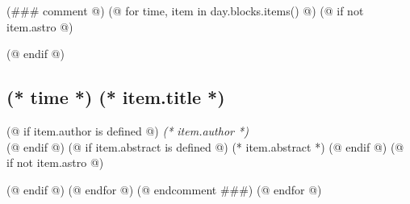 \documentclass[a4paper]{report}
\begin{document}
(### comment @)
        (@ for time, item in day.blocks.items() @)
            (@ if not item.astro @)
                \begin{tcolorbox}
            (@ endif @)
                \subsection{(* time *) \hfill (* item.title *)}
                (@ if item.author is defined @)
                    \hfill \textit{(* item.author *)} \\
                (@ endif @)
                (@ if item.abstract is defined @)
                    (* item.abstract *)
                (@ endif @)
            (@ if not item.astro @)
                \end{tcolorbox}
            (@ endif @)
        (@ endfor @)
(@ endcomment ###)
    (@ endfor @)
\end{document}
